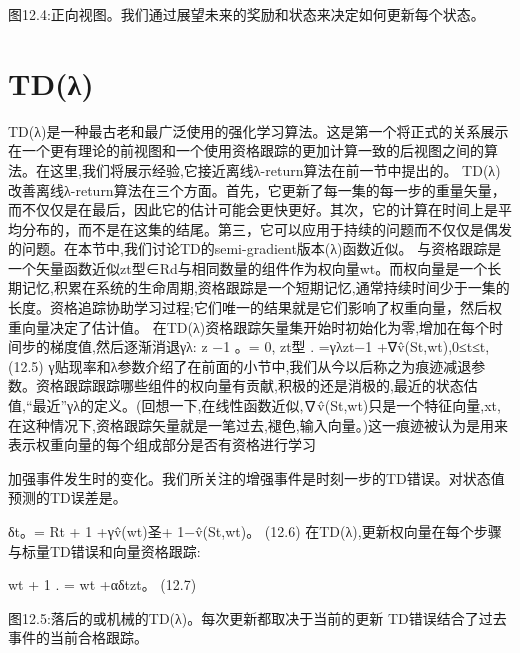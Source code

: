 图12.4:正向视图。我们通过展望未来的奖励和状态来决定如何更新每个状态。

\section{TD(λ)}
TD(λ)是一种最古老和最广泛使用的强化学习算法。这是第一个将正式的关系展示在一个更有理论的前视图和一个使用资格跟踪的更加计算一致的后视图之间的算法。在这里,我们将展示经验,它接近离线λ-return算法在前一节中提出的。
TD(λ)改善离线λ-return算法在三个方面。首先，它更新了每一集的每一步的重量矢量，而不仅仅是在最后，因此它的估计可能会更快更好。其次，它的计算在时间上是平均分布的，而不是在这集的结尾。第三，它可以应用于持续的问题而不仅仅是偶发的问题。在本节中,我们讨论TD的semi-gradient版本(λ)函数近似。
与资格跟踪是一个矢量函数近似zt型∈Rd与相同数量的组件作为权向量wt。而权向量是一个长期记忆,积累在系统的生命周期,资格跟踪是一个短期记忆,通常持续时间少于一集的长度。资格追踪协助学习过程;它们唯一的结果就是它们影响了权重向量，然后权重向量决定了估计值。
在TD(λ)资格跟踪矢量集开始时初始化为零,增加在每个时间步的梯度值,然后逐渐消退γλ:
z
−1
。= 0,
zt型
.
=γλzt−1 +∇v̂(St,wt),0≤t≤t, 					(12.5)
γ贴现率和λ参数介绍了在前面的小节中,我们从今以后称之为痕迹减退参数。资格跟踪跟踪哪些组件的权向量有贡献,积极的还是消极的,最近的状态估值,“最近”γλ的定义。(回想一下,在线性函数近似,∇v̂(St,wt)只是一个特征向量,xt,在这种情况下,资格跟踪矢量就是一笔过去,褪色,输入向量。)这一痕迹被认为是用来表示权重向量的每个组成部分是否有资格进行学习

加强事件发生时的变化。我们所关注的增强事件是时刻一步的TD错误。对状态值预测的TD误差是。

δt。= Rt + 1 +γv̂(wt)圣+ 1−v̂(St,wt)。 					(12.6)
在TD(λ),更新权向量在每个步骤与标量TD错误和向量资格跟踪:

wt + 1
.
= wt +αδtzt。 					(12.7)
 
 
图12.5:落后的或机械的TD(λ)。每次更新都取决于当前的更新
TD错误结合了过去事件的当前合格跟踪。

